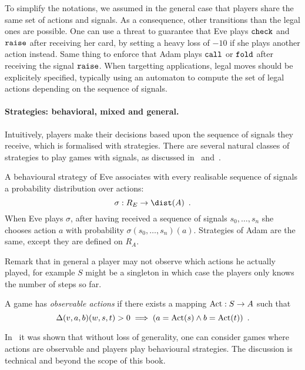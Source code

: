 To simplify the notations,
we assumed in the general case
that players share the same set of actions and signals.
As a consequence, other transitions than the legal ones
are possible. 
One can use a threat to guarantee that Eve plays
${\tt check}$ and ${\tt raise}$ after receiving her card,
by setting a heavy loss of $-10$ if she plays another action instead.
Same thing to enforce that Adam plays ${\tt call}$ or ${\tt fold}$
after receiving the signal ${\tt raise}$.
When targetting applications,
legal moves should be explicitely
specified, typically using an automaton
to compute the set of legal actions
depending on the sequence of signals.



\paragraph{Strategies: behavioral, mixed and general.}

Intuitively, players make their decisions based upon the sequence of
signals they receive, which is formalised with strategies. 
There are several natural classes of strategies to play games with signals, as discussed in~\cite{horn_remember} and~\cite[Section 4]{BGGjacm}.

A behavioural strategy of Eve associates
with every realisable sequence of signals a probability distribution
over actions:  
\[
\sigma: R_E \to \dist(A)\enspace.
\]
When Eve plays $\sigma$, after having received a sequence of signals
$s_0,\ldots,s_n$ she chooses action $a$ with probability
$\sigma(s_0,\ldots,s_n)(a)$. 
Strategies of Adam are the same, except they are defined on $R_A$.


Remark that in general a player may not observe which actions he actually played,
for example $S$ might be a singleton 
in which case the players only knows the number of steps so far.

A game has \emph{observable actions} if there exists a mapping
 $\text{Act}:S \to A$ 
 such that
\[
\Delta(v,a,b)(w,s,t)>0 
\implies
(a=\text{Act}(s) \land b=\text{Act}(t))\enspace. 
\]

In~\cite[Lemma 4.6 and 4.7]{BGGjacm} it was shown that without loss of generality,
one can consider games where actions are observable and players 
play behavioural strategies. The discussion is technical and beyond the scope of this book.
